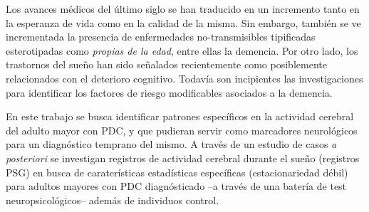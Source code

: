 % 
% 
%


Los avances m\'edicos del \'ultimo siglo se han traducido en un incremento tanto en la esperanza
de vida como en la calidad de la misma. Sin embargo, tambi\'en se ve incrementada la presencia
de enfermedades no-transmisibles tipificadas esterotipadas como \textit{propias de la edad},
entre ellas la demencia.
Por otro lado, los trastornos del sue\~no 
han sido se\~nalados recientemente como posiblemente 
relacionados con el deterioro cognitivo.
Todav\'ia son incipientes las investigaciones para identificar los factores de riesgo modificables
asociados a la demencia. \cite{PlanAlzheimer04}


En este trabajo se busca identificar patrones espec\'ificos en la actividad cerebral del adulto
mayor con PDC, y que pudieran servir como marcadores neurol\'ogicos para un diagn\'ostico
temprano del mismo.
A trav\'es de un estudio de casos \textit{a posteriori}
se investigan registros de actividad cerebral durante el sue\~no (registros PSG)
en busca de carater\'isticas estad\'isticas espec\'ificas (estacionariedad d\'ebil) para adultos 
mayores con PDC diagn\'osticado --a trav\'es de una bater\'ia de test neuropsicol\'ogicos--
adem\'as de individuos control.

